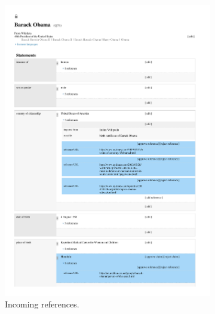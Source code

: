 \documentclass{sig-alternate-2013}
\begin{document}
\begin{figure}[!t]
    \centering
    \begin{subfigure}[b]{1.0\columnwidth}
        \includegraphics[width=\textwidth]{img/primary-sources.pdf}
        \caption{Incoming references.}
        \label{fig:barack-obama}
    \end{subfigure}
    \begin{subfigure}[b]{1.0\columnwidth}

\end{subfigure}
\end{figure}
\end{document}
